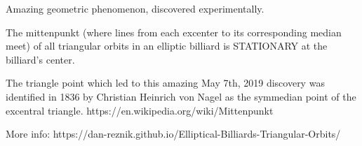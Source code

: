 Amazing geometric phenomenon, discovered experimentally.

The mittenpunkt (where lines from each excenter to its corresponding median meet) of all triangular orbits in an elliptic billiard is STATIONARY at the billiard's center.

The triangle point which led to this amazing May 7th, 2019 discovery was identified in 1836 by Christian Heinrich von Nagel as the symmedian point of the excentral triangle. https://en.wikipedia.org/wiki/Mittenpunkt

More info: https://dan-reznik.github.io/Elliptical-Billiards-Triangular-Orbits/